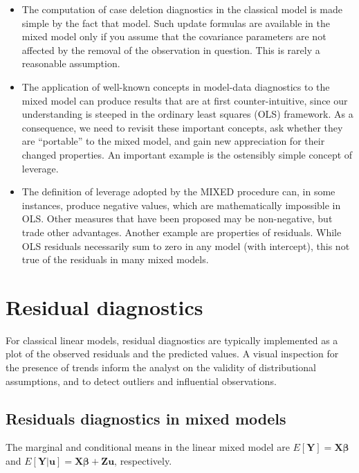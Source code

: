 \documentclass[Main.tex]{subfiles}
\begin{document}
\begin{itemize}
\begin{itemize}
		\item The computation of case deletion diagnostics in the classical model is made simple by the fact that
		model. Such update formulas are available in the mixed model only if you assume that the covariance
		parameters are not affected by the removal of the observation in question. This is rarely a reasonable
		assumption.
		\item The application of well-known concepts in model-data diagnostics to the mixed model can produce results
		that are at first counter-intuitive, since our understanding is steeped in the ordinary least squares
		(OLS) framework. As a consequence, we need to revisit these important concepts, ask whether they
		are “portable” to the mixed model, and gain new appreciation for their changed properties. An important
		example is the ostensibly simple concept of leverage. 
		\item The definition of leverage adopted by
		the MIXED procedure can, in some instances, produce negative values, which are mathematically
		impossible in OLS. Other measures that have been proposed may be non-negative, but trade other
		advantages. Another example are properties of residuals. While OLS residuals necessarily sum to
		zero in any model (with intercept), this not true of the residuals in many mixed models.
	\end{itemize}
	\newpage

\section{Residual diagnostics} %
For classical linear models, residual diagnostics are typically implemented as a plot of the observed residuals and the predicted values. A visual inspection for the presence of trends inform the analyst on the validity of distributional assumptions, and to detect outliers and influential observations.



\subsection{Residuals diagnostics in mixed models}

The marginal and conditional means in the linear mixed model are
$E[\boldsymbol{Y}] = \boldsymbol{X}\boldsymbol{\beta}$ and
$E[\boldsymbol{Y|\boldsymbol{u}}] = \boldsymbol{X}\boldsymbol{\beta} + \boldsymbol{Z}\boldsymbol{u}$, respectively.


\end{itemize}
\end{document}
